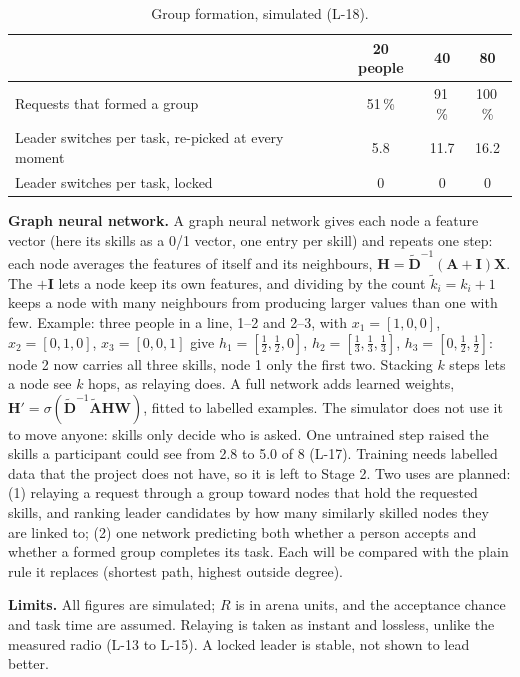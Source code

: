 \IfFileExists{IEEEtran.cls}{\documentclass[conference]{IEEEtran}}{\documentclass[10pt,twocolumn]{article}}
\begin{document}
\begin{table}[H]
\caption{Group formation, simulated (L-18).}\label{tab:group}
\centering\footnotesize
\begin{tabular}{@{}l ccc@{}}
\toprule
 & 20 people & 40 & 80\\
\midrule
Requests that formed a group & 51\,\% & 91\,\% & 100\,\%\\
Leader switches per task, re-picked at every moment & 5.8 & 11.7 & 16.2\\
Leader switches per task, locked & 0 & 0 & 0\\
\bottomrule
\end{tabular}
\end{table}

\textbf{Graph neural network.} A graph neural network gives each node a feature vector (here its skills as a 0/1 vector, one entry per skill) and repeats one step: each node averages the features of itself and its neighbours, $\mathbf H=\tilde{\mathbf D}^{-1}(\mathbf A+\mathbf I)\mathbf X$. The $+\mathbf I$ lets a node keep its own features, and dividing by the count $\tilde k_i=k_i+1$ keeps a node with many neighbours from producing larger values than one with few. Example: three people in a line, 1--2 and 2--3, with $x_1=[1,0,0]$, $x_2=[0,1,0]$, $x_3=[0,0,1]$ give $h_1=[\tfrac12,\tfrac12,0]$, $h_2=[\tfrac13,\tfrac13,\tfrac13]$, $h_3=[0,\tfrac12,\tfrac12]$: node 2 now carries all three skills, node 1 only the first two. Stacking $k$ steps lets a node see $k$ hops, as relaying does. A full network adds learned weights, $\mathbf H'=\sigma(\tilde{\mathbf D}^{-1}\tilde{\mathbf A}\mathbf H\mathbf W)$, fitted to labelled examples. The simulator does not use it to move anyone: skills only decide who is asked. One untrained step raised the skills a participant could see from 2.8 to 5.0 of 8 (L-17). Training needs labelled data that the project does not have, so it is left to Stage 2. Two uses are planned: (1) relaying a request through a group toward nodes that hold the requested skills, and ranking leader candidates by how many similarly skilled nodes they are linked to; (2) one network predicting both whether a person accepts and whether a formed group completes its task. Each will be compared with the plain rule it replaces (shortest path, highest outside degree).

\textbf{Limits.} All figures are simulated; $R$ is in arena units, and the acceptance chance and task time are assumed. Relaying is taken as instant and lossless, unlike the measured radio (L-13 to L-15). A locked leader is stable, not shown to lead better.
\end{document}
